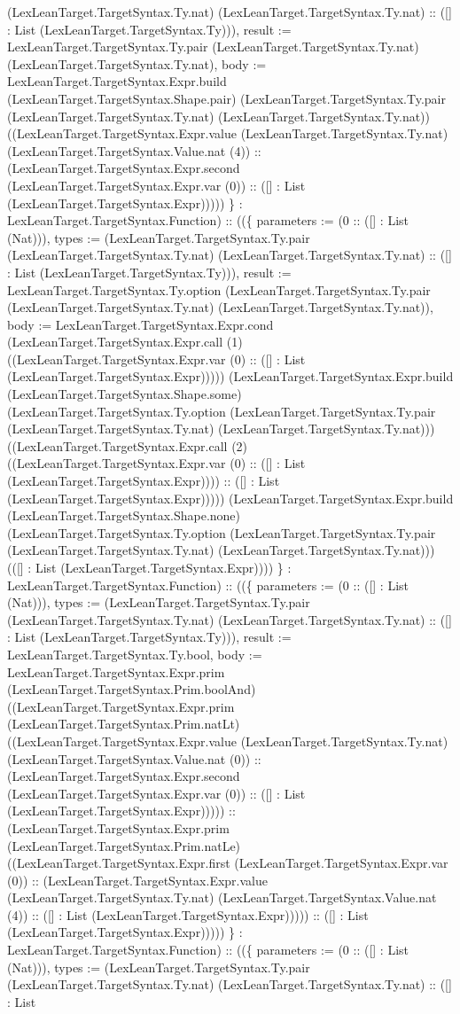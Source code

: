 \documentclass[11pt]{article}
\begin{document}
(LexLeanTarget.TargetSyntax.Ty.nat) (LexLeanTarget.TargetSyntax.Ty.nat) :: ([] : List (LexLeanTarget.TargetSyntax.Ty))), result := LexLeanTarget.TargetSyntax.Ty.pair (LexLeanTarget.TargetSyntax.Ty.nat) (LexLeanTarget.TargetSyntax.Ty.nat), body := LexLeanTarget.TargetSyntax.Expr.build (LexLeanTarget.TargetSyntax.Shape.pair) (LexLeanTarget.TargetSyntax.Ty.pair (LexLeanTarget.TargetSyntax.Ty.nat) (LexLeanTarget.TargetSyntax.Ty.nat)) ((LexLeanTarget.TargetSyntax.Expr.value (LexLeanTarget.TargetSyntax.Ty.nat) (LexLeanTarget.TargetSyntax.Value.nat (4)) :: (LexLeanTarget.TargetSyntax.Expr.second (LexLeanTarget.TargetSyntax.Expr.var (0)) :: ([] : List (LexLeanTarget.TargetSyntax.Expr))))) \} : LexLeanTarget.TargetSyntax.Function) :: ((\{ parameters := (0 :: ([] : List (Nat))), types := (LexLeanTarget.TargetSyntax.Ty.pair (LexLeanTarget.TargetSyntax.Ty.nat) (LexLeanTarget.TargetSyntax.Ty.nat) :: ([] : List (LexLeanTarget.TargetSyntax.Ty))), result := LexLeanTarget.TargetSyntax.Ty.option (LexLeanTarget.TargetSyntax.Ty.pair (LexLeanTarget.TargetSyntax.Ty.nat) (LexLeanTarget.TargetSyntax.Ty.nat)), body := LexLeanTarget.TargetSyntax.Expr.cond (LexLeanTarget.TargetSyntax.Expr.call (1) ((LexLeanTarget.TargetSyntax.Expr.var (0) :: ([] : List (LexLeanTarget.TargetSyntax.Expr))))) (LexLeanTarget.TargetSyntax.Expr.build (LexLeanTarget.TargetSyntax.Shape.some) (LexLeanTarget.TargetSyntax.Ty.option (LexLeanTarget.TargetSyntax.Ty.pair (LexLeanTarget.TargetSyntax.Ty.nat) (LexLeanTarget.TargetSyntax.Ty.nat))) ((LexLeanTarget.TargetSyntax.Expr.call (2) ((LexLeanTarget.TargetSyntax.Expr.var (0) :: ([] : List (LexLeanTarget.TargetSyntax.Expr)))) :: ([] : List (LexLeanTarget.TargetSyntax.Expr))))) (LexLeanTarget.TargetSyntax.Expr.build (LexLeanTarget.TargetSyntax.Shape.none) (LexLeanTarget.TargetSyntax.Ty.option (LexLeanTarget.TargetSyntax.Ty.pair (LexLeanTarget.TargetSyntax.Ty.nat) (LexLeanTarget.TargetSyntax.Ty.nat))) (([] : List (LexLeanTarget.TargetSyntax.Expr)))) \} : LexLeanTarget.TargetSyntax.Function) :: ((\{ parameters := (0 :: ([] : List (Nat))), types := (LexLeanTarget.TargetSyntax.Ty.pair (LexLeanTarget.TargetSyntax.Ty.nat) (LexLeanTarget.TargetSyntax.Ty.nat) :: ([] : List (LexLeanTarget.TargetSyntax.Ty))), result := LexLeanTarget.TargetSyntax.Ty.bool, body := LexLeanTarget.TargetSyntax.Expr.prim (LexLeanTarget.TargetSyntax.Prim.boolAnd) ((LexLeanTarget.TargetSyntax.Expr.prim (LexLeanTarget.TargetSyntax.Prim.natLt) ((LexLeanTarget.TargetSyntax.Expr.value (LexLeanTarget.TargetSyntax.Ty.nat) (LexLeanTarget.TargetSyntax.Value.nat (0)) :: (LexLeanTarget.TargetSyntax.Expr.second (LexLeanTarget.TargetSyntax.Expr.var (0)) :: ([] : List (LexLeanTarget.TargetSyntax.Expr))))) :: (LexLeanTarget.TargetSyntax.Expr.prim (LexLeanTarget.TargetSyntax.Prim.natLe) ((LexLeanTarget.TargetSyntax.Expr.first (LexLeanTarget.TargetSyntax.Expr.var (0)) :: (LexLeanTarget.TargetSyntax.Expr.value (LexLeanTarget.TargetSyntax.Ty.nat) (LexLeanTarget.TargetSyntax.Value.nat (4)) :: ([] : List (LexLeanTarget.TargetSyntax.Expr))))) :: ([] : List (LexLeanTarget.TargetSyntax.Expr))))) \} : LexLeanTarget.TargetSyntax.Function) :: ((\{ parameters := (0 :: ([] : List (Nat))), types := (LexLeanTarget.TargetSyntax.Ty.pair (LexLeanTarget.TargetSyntax.Ty.nat) (LexLeanTarget.TargetSyntax.Ty.nat) :: ([] : List 
\end{document}
